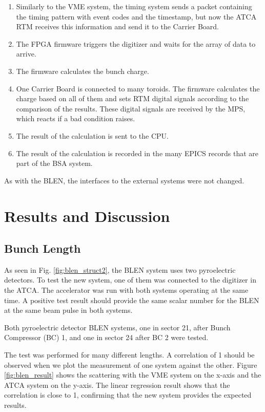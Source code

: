 \documentclass[letter,
        biblatex,   %
        keeplastbox,  %
        ]{jacow}
\begin{document}
\begin{enumerate}
  \item Similarly to the VME system, the timing system sends a packet containing the timing pattern with event codes and the timestamp, but now the ATCA RTM receives this information and send it to the Carrier Board.
  \item The FPGA firmware triggers the digitizer and waits for the array of data to arrive.
  \item The firmware calculates the bunch charge.
  \item One Carrier Board is connected to many toroids. The firmware calculates the charge based on all of them and sets RTM digital signals according to the comparison of the results. These digital signals are received by the MPS, which reacts if a bad condition raises.
  \item The result of the calculation is sent to the CPU.
  \item The result of the calculation is recorded in the many EPICS records that are part of the BSA system.
\end{enumerate}

As with the BLEN, the interfaces to the external systems were not changed.

\section{Results and Discussion}
\subsection{Bunch Length}
As seen in Fig. \ref{fig:blen_struct2}, the BLEN system uses two pyroelectric detectors. To test the new system, one of them was connected to the digitizer in the ATCA. The accelerator was run with both systems operating at the same time. A positive test result should provide the same scalar number for the BLEN at the same beam pulse in both systems.

Both pyroelectric detector BLEN systems, one in sector 21, after Bunch Compressor (BC) 1, and one in sector 24 after BC 2 were tested.

The test was performed for many different lengths. A correlation of 1 should be observed when we plot the measurement of one system against the other. Figure \ref{fig:blen_result} shows the scattering with the VME system on the x-axis and the ATCA system on the y-axis. The linear regression result shows that the correlation is close to 1, confirming that the new system provides the expected results.
\end{document}
